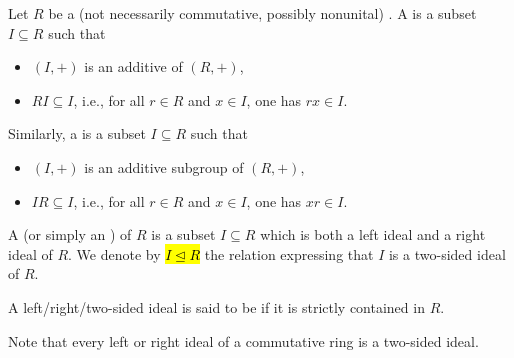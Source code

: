 \begin{definition} \label{definition:ideal_of_a_ring}
Let $R$ be a (not necessarily commutative, possibly nonunital) .  
A  is a subset $I \subseteq R$ such that
\begin{itemize}
    \item $(I,+)$ is an additive  of $(R,+)$,
    \item $RI \subseteq I$, i.e., for all $r \in R$ and $x \in I$, one has $rx \in I$.
\end{itemize}
Similarly, a  is a subset $I \subseteq R$ such that
\begin{itemize}
    \item $(I,+)$ is an additive subgroup of $(R,+)$,
    \item $IR \subseteq I$, i.e., for all $r \in R$ and $x \in I$, one has $xr \in I$.
\end{itemize}
A  (or simply an ) of $R$ is a subset $I \subseteq R$ which is both a left ideal and a right ideal of $R$. We denote by \hl{$I \unlhd R$} the relation expressing that $I$ is a two-sided ideal of $R$.


A left/right/two-sided ideal is said to be  if it is strictly contained in $R$.


Note that every left or right ideal of a commutative ring is a two-sided ideal.


\end{definition}
